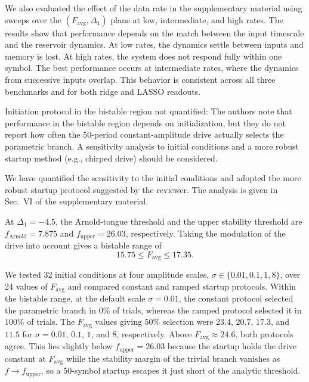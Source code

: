 \documentclass{ar2rc}
\begin{document}
We also evaluated the effect of the data rate in the supplementary material using sweeps over the $(F_{\mathrm{avg}},\Delta_1)$ plane at low, intermediate, and high rates. The results show that performance depends on the match between the input timescale and the reservoir dynamics. At low rates, the dynamics settle between inputs and memory is lost. At high rates, the system does not respond fully within one symbol. The best performance occurs at intermediate rates, where the dynamics from successive inputs overlap. This behavior is consistent across all three benchmarks and for both ridge and LASSO readouts.

\RC \label{rev:2.4}Initiation protocol in the bistable region not quantified: The authors note that performance in the bistable region depends on initialization, but they do not report how often the 50-period constant-amplitude drive actually selects the parametric branch. A sensitivity analysis to initial conditions and a more robust startup method (e.g., chirped drive) should be considered.

\AR We have quantified the sensitivity to the initial conditions and adopted the more robust startup protocol suggested by the reviewer. The analysis is given in Sec.~VI of the supplementary material.

At $\Delta_1=-4.5$, the Arnold-tongue threshold and the upper stability threshold are $f_{\mathrm{Arnold}}=7.875$ and $f_{\mathrm{upper}}=26.03$, respectively. Taking the modulation of the drive into account gives a bistable range of
\begin{equation}
	15.75 \leq F_{\mathrm{avg}} \leq 17.35.
\end{equation}

We tested 32 initial conditions at four amplitude scales, $\sigma\in\{0.01,0.1,1,8\}$, over 24 values of $F_{\mathrm{avg}}$ and compared constant and ramped startup protocols. Within the bistable range, at the default scale $\sigma=0.01$, the constant protocol selected the parametric branch in $0\%$ of trials, whereas the ramped protocol selected it in $100\%$ of trials. The $F_{\mathrm{avg}}$ values giving $50\%$ selection were $23.4$, $20.7$, $17.3$, and $11.5$ for $\sigma=0.01$, $0.1$, $1$, and $8$, respectively. Above $F_{\mathrm{avg}}\approx24.6$, both protocols agree. This lies slightly below $f_{\mathrm{upper}}=26.03$ because the startup holds the drive constant at $F_{\mathrm{avg}}$ while the stability margin of the trivial branch vanishes as $f\rightarrow f_{\mathrm{upper}}$, so a 50-symbol startup escapes it just short of the analytic threshold.
\end{document}
